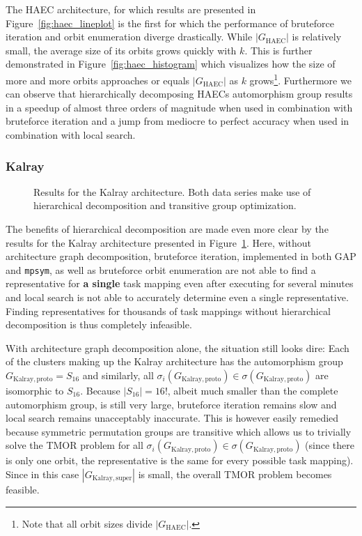 The HAEC architecture, for which results are presented in
Figure~\ref{fig:haec_lineplot} is the first for which the performance of
bruteforce iteration and orbit enumeration diverge drastically. While
$|G_{\mathrm{HAEC}}|$ is relatively small, the average
size of its orbits grows quickly with $k$. This is further demonstrated in
Figure~\ref{fig:haec_histogram} which visualizes how the size of more and more
orbits approaches or equals $|G_{\mathrm{HAEC}}|$ as $k$ grows\footnote{Note that
all orbit sizes divide $|G_{\mathrm{HAEC}}|$.}. Furthermore we can observe that
hierarchically decomposing HAECs automorphism group results in a speedup of
almost three orders of magnitude when used in combination with bruteforce
iteration and a jump from mediocre to perfect accuracy when used in combination
with local search.

\subsubsection{Kalray}

\begin{figure}
  \caption{Results for the Kalray architecture. Both data series make use
           of hierarchical decomposition and transitive group optimization.}
  \label{fig:kalray_lineplot}
\end{figure}

The benefits of hierarchical decomposition are made even more clear by the
results for the Kalray architecture presented in
Figure~\ref{fig:kalray_lineplot}.  Here, without architecture graph
decomposition, bruteforce iteration, implemented in both GAP and
\texttt{mpsym}, as well as bruteforce orbit enumeration are not able to find a
representative for \textbf{a single} task mapping even after executing for
several minutes and local search is not able to accurately determine even a
single representative.  Finding representatives for thousands of task mappings
without hierarchical decomposition is thus completely infeasible.

With architecture graph decomposition alone, the situation still looks dire:
Each of the clusters making up the Kalray architecture has the automorphism
group $G_{\mathrm{Kalray,proto}} = S_{16}$ and similarly, all
$\sigma_i(G_{\mathrm{Kalray,proto}}) \in \sigma(G_{\mathrm{Kalray,proto}})$ are
isomorphic to $S_{16}$.  Because $|S_{16}| = 16!$, albeit much smaller than the
complete automorphism group, is still very large, bruteforce iteration remains
slow and local search remains unacceptably inaccurate. This is however easily
remedied because symmetric permutation groups are transitive which allows us to
trivially solve the TMOR problem for all $\sigma_i(G_{\mathrm{Kalray,proto}})
\in \sigma(G_{\mathrm{Kalray,proto}})$ (since there is only one orbit, the
representative is the same for every possible task mapping). Since in this case
$|G_{\mathrm{Kalray,super}}|$ is small, the overall TMOR problem becomes
feasible.

